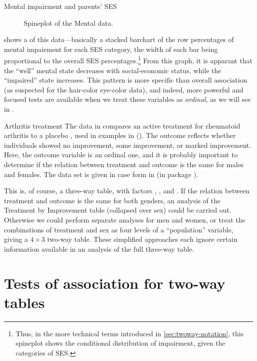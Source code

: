 \documentclass[10pt,krantz2]{krantz}\usepackage[]{graphicx}\usepackage[]{color}
\newenvironment{knitrout}{}{} %
\renewenvironment{knitrout}{\small\renewcommand{\baselinestretch}{.85}}{} %
\begin{document}
\begin{Example}[mental1]{Mental impairment and parents' SES}
\begin{knitrout}
\begin{figure}[!htbp]
\caption[Spineplot of the Mental data]{Spineplot of the Mental data.}\label{fig:spineplot}
\end{figure}


\end{knitrout}
 shows a  of this
data---basically a stacked barchart of the row percentages of mental
impairment for each SES category, the width of each bar being proportional to
the overall SES percentages.\footnote{Thus, in the more technical terms introduced in \ref{sec:twoway-notation}, 
this spineplot shows the conditional distribution of impairment, given
the categories of SES.}
From this graph, it is apparant that the ``well'' mental state decreases with
social-economic status, while the ``impaired'' state increases. This
pattern is more specific than overall association (as
suspected for the hair-color eye-color data), and indeed, more powerful and focused tests are available
when we treat these variables as \emph{ordinal}, as we will see in
.
\end{Example}

\begin{Example}[arthrit1]{Arthritis treatment}
The data in  compares an active treatment for rheumatoid
arthritis to a placebo
\citep{KochEdwards:88}, used in examples in 
().
The outcome reflects
whether individuals showed no improvement, some improvement, or
marked improvement.
Here, the outcome variable is an ordinal one, and it is probably
important to determine if the relation between treatment and outcome
is the same for males and females.
The data set is given in case form in  (in package ).


This is, of course, a three-way table, with factors
, , and .
If the relation between treatment and outcome is the same for
both genders, an analysis of the Treatment by Improvement
table (collapsed over sex) could be carried out.
Otherwise we could perform separate analyses for
men and women, or
treat the combinations of treatment and sex as four levels of
a ``population'' variable, giving a $4 \times 3$ two-way table.
These simplified approaches each ignore certain information
available in
an analysis of the full three-way table.
\end{Example}

\section{Tests of association for two-way tables}\label{sec:twoway-tests}
\end{document}
